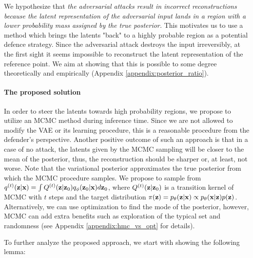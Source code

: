 We hypothesize that \textit{the adversarial attacks result in incorrect reconstructions because the latent representation of the adversarial input lands in a region with a lower probability mass assigned by the true posterior. %
}
This motivates us to use a method which brings the latents "back" to a highly probable region as a potential defence strategy. 
Since the adversarial attack destroys the input irreversibly, at the first sight it seems impossible to reconstruct the latent representation of the reference point. 
We aim at showing that this is possible to some degree theoretically and empirically (Appendix \ref{appendix:posterior_ratio}). 

\paragraph{The proposed solution } In order to steer the latents towards high probability regions, we propose to utilize an MCMC method during inference time. 
Since we are not allowed to modify the VAE or its learning procedure, this is a reasonable procedure from the defender's perspective. 
Another positive outcome of such an approach is that in a case of no attack, the latents given by the MCMC sampling will be closer to the mean of the posterior, thus, the reconstruction should be sharper or, at least, not worse. 
Note that the variational posterior approximates the true posterior from which the MCMC procedure samples. 
We propose to sample from $q^{(t)}({\mathbf{z}}|{\mathbf{x}}) = \int Q^{(t)}({\mathbf{z}}|{\mathbf{z}}_0) q_{\phi}({\mathbf{z}}_0|{\mathbf{x}}) d{\mathbf{z}}_0$, where $Q^{(t)}({\mathbf{z}}|{\mathbf{z}}_0)$ is a transition kernel of MCMC with $t$ steps and the target distribution $\pi({\mathbf{z}}) = p_{\theta}({\mathbf{z}}|{\mathbf{x}}) \propto p_{\theta}({\mathbf{x}}|{\mathbf{z}})p({\mathbf{z}})$. 
Alternatively, we can use optimization to find the mode of the posterior, however, MCMC can add extra benefits such as exploration of the typical set and randomness (see Appendix \ref{appendix:hmc_vs_opt} for details).

To further analyze the proposed approach, we start with showing the following lemma:

